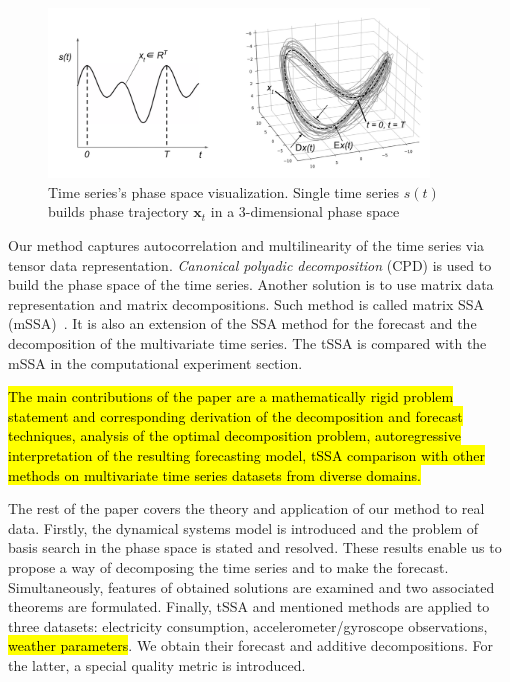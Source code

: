 \documentclass[referee, pdflatex, sn-mathphys-num]{sn-jnl}
\theoremstyle{definition}
\theoremstyle{plain}
\begin{document}
	\begin{figure}[!htbp]
		\centering
		\includegraphics[width=0.9\textwidth, keepaspectratio]{phase_traj.png}
		\caption{Time series's phase space visualization. Single time series $ s(t) $ builds phase trajectory $ \mathbf{x}_t $ in a 3-dimensional phase space}\label{pic:phase_traj}
	\end{figure}
	
	Our method captures autocorrelation and multilinearity of the time series via tensor data representation. \emph{Canonical polyadic decomposition} (CPD) is used to build the phase space of the time series. Another solution is to use matrix data representation and matrix decompositions. Such method is called matrix SSA (mSSA)~\cite{mSSA_overview}. It is also an extension of the SSA method for the forecast and the decomposition of the multivariate time series. The tSSA is compared with the mSSA in the computational experiment section.
	
	\hl{The main contributions of the paper are a mathematically rigid problem statement and corresponding derivation of the decomposition and forecast techniques, analysis of the optimal decomposition problem, autoregressive interpretation of the resulting forecasting model, tSSA comparison with other methods on multivariate time series datasets from diverse domains.}
	
	The rest of the paper covers the theory and application of our method to real data. Firstly, the dynamical systems model is introduced and the problem of basis search in the phase space is stated and resolved. These results enable us to propose a way of decomposing the time series and to make the forecast. Simultaneously, features of obtained solutions are examined and two associated theorems are formulated. Finally, tSSA and mentioned methods are applied to three datasets: electricity consumption, accelerometer/gyroscope observations, \hl{weather parameters}. We obtain their forecast and additive decompositions. For the latter, a special quality metric is introduced.
	
\end{document}
